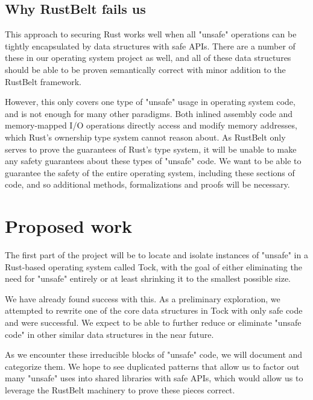 \documentclass[12pt]{article}
\begin{document}
\subsection{Why RustBelt fails us}
This approach to securing Rust works well when all "unsafe" operations can be tightly encapsulated by data structures with safe APIs. There are a number of these in our operating system project as well, and all of these data structures should be able to be proven semantically correct with minor addition to the RustBelt framework.

However, this only covers one type of "unsafe" usage in operating system code, and is not enough for many other paradigms. Both inlined assembly code and memory-mapped I/O operations directly access and modify memory addresses, which Rust's ownership type system cannot reason about. As RustBelt only serves to prove the guarantees of Rust's type system, it will be unable to make any safety guarantees about these types of "unsafe" code. We want to be able to guarantee the safety of the entire operating system, including these sections of code, and so additional methods, formalizations and proofs will be necessary.


\section{Proposed work}
The first part of the project will be to locate and isolate instances of "unsafe" in a Rust-based operating system called Tock, with the goal of either eliminating the need for "unsafe" entirely or at least shrinking it to the smallest possible size. 

We have already found success with this. As a preliminary exploration, we attempted to rewrite one of the core data structures in Tock with only safe code and were successful. We expect to be able to further reduce or eliminate "unsafe code" in other similar data structures in the near future.

As we encounter these irreducible blocks of "unsafe" code, we will document and categorize them. We hope to see duplicated patterns that allow us to factor out many "unsafe" uses into shared libraries with safe APIs, which would allow us to leverage the RustBelt machinery to prove these pieces correct.
\end{document}
